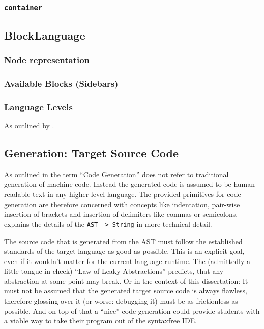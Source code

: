 \subsubsection{\texttt{container}}

\subsection{BlockLanguage}

\subsubsection{Node representation}

\subsubsection{Available Blocks (Sidebars)}

\subsubsection{Language Levels}

As outlined by \cite{klaeren_macht_2007}.

\subsection{Generation: Target Source Code}

As outlined in  the term \enquote{Code Generation} does not refer to traditional generation of machine code. Instead the generated code is assumed to be human readable text in any higher level language. The provided primitives for code generation are therefore concerned with concepts like indentation, pair-wise insertion of brackets and insertion of delimiters like commas or semicolons.  explains the details of the \texttt{AST -> String} in more technical detail.

The source code that is generated from the AST must follow the established standards of the target language as good as possible. This is an explicit goal, even if it wouldn't matter for the current language runtime. The (admittedly a little tongue-in-cheek) \enquote{Law of Leaky Abstractions} \cite{spolsky_law_2002} predicts, that any abstraction at some point may break. Or in the context of this dissertation: It must not be assumed that the generated target source code is always flawless, therefore glossing over it (or worse: debugging it) must be as frictionless as possible. And on top of that a \enquote{nice} code generation could provide students with a viable way to take their program out of the syntaxfree IDE.

